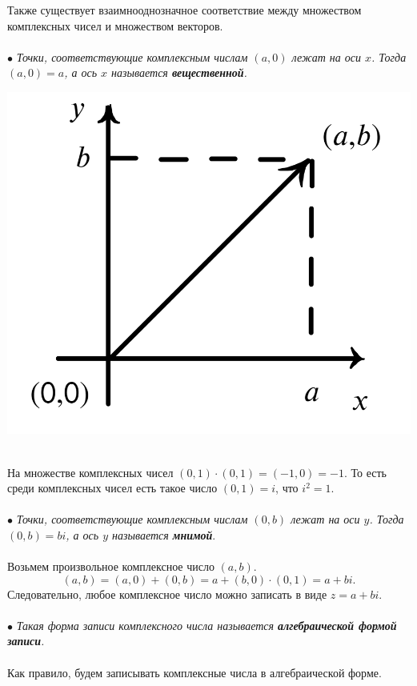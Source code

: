 \documentclass[a4paper, 12pt]{article}
\begin{document}
\noindent
\parbox[b][4cm][t]{110mm}{
Также существует взаимнооднозначное соответствие между множеством комплексных чисел и множеством векторов.\\\\
$\bullet$\textit{ Точки, соответствующие комплексным числам $(a,0)$ лежат на оси $x$. Тогда $(a,0) = a$, а ось $x$ называется \textbf{вещественной}.}}
\hfill
\parbox[b][5cm][t]{55mm}{
	\includegraphics[scale=0.35]{images/002.png}}\\
На множестве комплексных чисел $(0,1)\cdot (0,1) = (-1,0) = -1.$ То есть среди комплексных чисел есть такое число $(0,1) = i$, что $i^2 = 1$.\\\\
$\bullet$ \textit{Точки, соответствующие комплексным числам $(0,b)$ лежат на оси $y$. Тогда $(0,b) = bi$, а ось $y$ называется \textbf{мнимой}}.\\\\
Возьмем произвольное комплексное число $(a,b)$.
$$(a,b) = (a,0) + (0,b) = a+ (b,0)\cdot (0,1) = a+bi.$$
Следовательно, любое комплексное число можно записать в виде $z = a+bi$.\\\\
$\bullet$ \textit{Такая форма записи комплексного числа называется \textbf{алгебраической формой записи}.}\\\\
Как правило, будем записывать комплексные числа в алгебраической форме.\\\\
\end{document}
